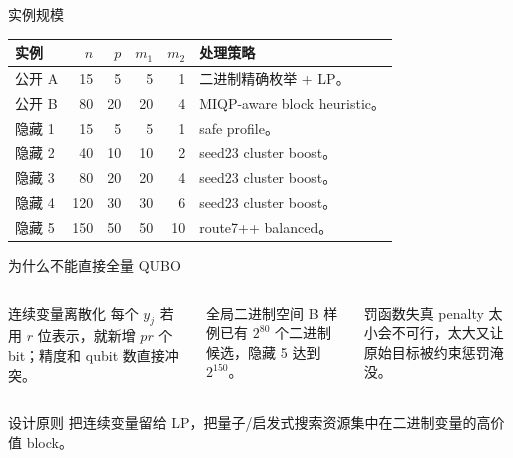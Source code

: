 \documentclass[aspectratio=169]{beamer}
\begin{document}
\begin{frame}{实例规模}
\small
\begin{tabularx}{\linewidth}{lrrrrY}
\toprule
实例 & $n$ & $p$ & $m_1$ & $m_2$ & 处理策略 \\
\midrule
公开 A & 15 & 5 & 5 & 1 & 二进制精确枚举 + LP。\\
公开 B & 80 & 20 & 20 & 4 & MIQP-aware block heuristic。\\
隐藏 1 & 15 & 5 & 5 & 1 & safe profile。\\
隐藏 2 & 40 & 10 & 10 & 2 & seed23 cluster boost。\\
隐藏 3 & 80 & 20 & 20 & 4 & seed23 cluster boost。\\
隐藏 4 & 120 & 30 & 30 & 6 & seed23 cluster boost。\\
隐藏 5 & 150 & 50 & 50 & 10 & route7++ balanced。\\
\bottomrule
\end{tabularx}
\end{frame}

\begin{frame}{为什么不能直接全量 QUBO}
\small
\begin{columns}[T,onlytextwidth]
\begin{column}{0.31\textwidth}
\begin{block}{连续变量离散化}
每个 $y_j$ 若用 $r$ 位表示，就新增 $pr$ 个 bit；精度和 qubit 数直接冲突。
\end{block}
\end{column}
\begin{column}{0.31\textwidth}
\begin{block}{全局二进制空间}
B 样例已有 $2^{80}$ 个二进制候选，隐藏 5 达到 $2^{150}$。
\end{block}
\end{column}
\begin{column}{0.31\textwidth}
\begin{block}{罚函数失真}
penalty 太小会不可行，太大又让原始目标被约束惩罚淹没。
\end{block}
\end{column}
\end{columns}
\vspace{3mm}
\begin{alertblock}{设计原则}
把连续变量留给 LP，把量子/启发式搜索资源集中在二进制变量的高价值 block。
\end{alertblock}
\end{frame}
\end{document}

